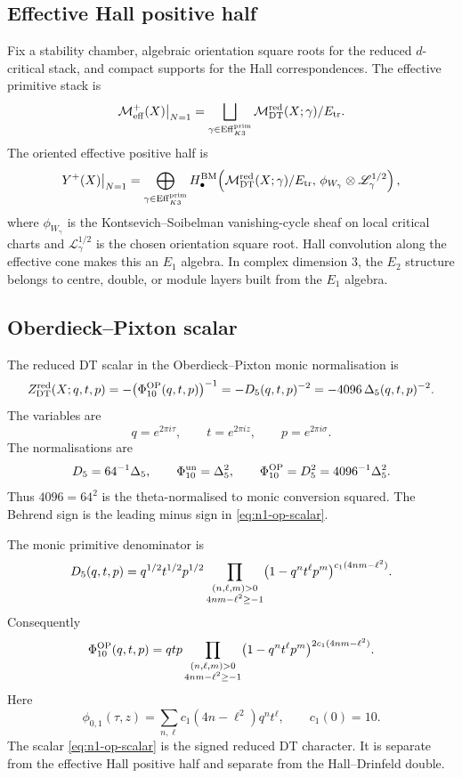 \subsection*{Effective Hall positive half}

Fix a stability chamber, algebraic orientation square roots for the
reduced \(d\)-critical stack, and compact supports for the Hall
correspondences. The effective primitive stack is
\[
  \mathcal{M}^{+}_{\mathrm{eff}}(X)\big|_{N=1}
  =
  \bigsqcup_{\gamma\in\mathrm{Eff}^{\mathrm{prim}}_{K3}}
  \mathcal{M}^{\mathrm{red}}_{\mathrm{DT}}(X;\gamma)/E_{\mathrm{tr}} .
\]
The oriented effective positive half is
\[
  Y^{+}(X)\big|_{N=1}
  =
  \bigoplus_{\gamma\in \mathrm{Eff}^{\mathrm{prim}}_{K3}}
  H^{\mathrm{BM}}_\bullet\!\left(
    \mathcal{M}^{\mathrm{red}}_{\mathrm{DT}}(X;\gamma)/E_{\mathrm{tr}},\,
    \phi_{W_\gamma}\otimes\mathscr L_\gamma^{1/2}
  \right),
\]
where \(\phi_{W_\gamma}\) is the Kontsevich--Soibelman
vanishing-cycle sheaf on local critical charts and
\(\mathscr L_\gamma^{1/2}\) is the chosen orientation square root. Hall
convolution along the effective cone makes this an \(E_1\) algebra. In
complex dimension \(3\), the \(E_2\) structure belongs to centre,
double, or module layers built from the \(E_1\) algebra.

\subsection*{Oberdieck--Pixton scalar}

The reduced DT scalar in the Oberdieck--Pixton monic normalisation is
\begin{equation}
\label{eq:n1-op-scalar}
  Z^{\mathrm{red}}_{\mathrm{DT}}(X;q,t,p)
  =
  -\bigl(\Phi_{10}^{\mathrm{OP}}(q,t,p)\bigr)^{-1}
  =
  -D_{5}(q,t,p)^{-2}
  =
  -4096\,\Delta_{5}(q,t,p)^{-2}.
\end{equation}
The variables are
\[
  q=e^{2\pi i\tau},\qquad
  t=e^{2\pi iz},\qquad
  p=e^{2\pi i\sigma}.
\]
The normalisations are
\[
  D_{5}=64^{-1}\Delta_{5},\qquad
  \Phi_{10}^{\mathrm{un}}=\Delta_{5}^2,\qquad
  \Phi_{10}^{\mathrm{OP}}=D_{5}^2=4096^{-1}\Delta_{5}^2.
\]
Thus \(4096=64^2\) is the theta-normalised to monic conversion squared.
The Behrend sign is the leading minus sign in
\eqref{eq:n1-op-scalar}.

The monic primitive denominator is
\[
  D_{5}(q,t,p)
  =
  q^{1/2}t^{1/2}p^{1/2}
  \prod_{\substack{(n,\ell,m)>0\\4nm-\ell^2\ge -1}}
  \bigl(1-q^n t^\ell p^m\bigr)^{c_1(4nm-\ell^2)}.
\]
Consequently
\[
  \Phi_{10}^{\mathrm{OP}}(q,t,p)
  =
  qtp
  \prod_{\substack{(n,\ell,m)>0\\4nm-\ell^2\ge -1}}
  \bigl(1-q^n t^\ell p^m\bigr)^{2c_1(4nm-\ell^2)}.
\]
Here
\[
  \phi_{0,1}(\tau,z)
  =
  \sum_{n,\ell}c_1(4n-\ell^2)q^n t^\ell,
  \qquad
  c_1(0)=10.
\]
The scalar \eqref{eq:n1-op-scalar} is the signed reduced DT character.
It is separate from the effective Hall positive half and separate from
the Hall--Drinfeld double.

